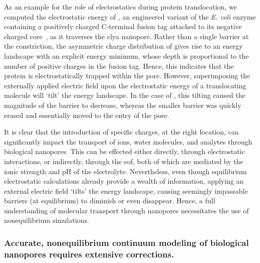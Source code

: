 As an example for the role of electrostatics during protein translocation, we computed the electrostatic
energy of \DHFRt{}, an engineered variant of the \textit{E. coli}  enzyme containing a
positively charged C-terminal fusion tag attached to its negative charged core~\cite{Soskine-Biesemans-2015},
as it traverses the \gls{clya} nanopore. Rather than a single barrier at the constriction, the asymmetric
charge distribution of \DHFRt{} gives rise to an energy landscape with an explicit energy minimum, whose depth
is proportional to the number of positive charges in the fusion tag. Hence, this indicates that the protein is
electrostatically trapped within the pore. However, superimposing the externally applied electric field upon
the electrostatic energy of a translocating molecule will `tilt' the energy landscape. In the case of
\DHFRt{}, this tilting caused the magnitude of the \transi{} barrier to decrease, whereas the smaller \cisi{}
barrier was quickly erased and essentially moved to the \cisi{} entry of the pore.

It is clear that the introduction of specific charges, at the right location, can significantly impact the
transport of ions, water molecules, and analytes through biological nanopores. This can be effected either
directly, through electrostatic interactions, or indirectly, through the \gls{eof}, both of which are mediated
by the ionic strength and pH of the electrolyte. Nevertheless, even though equilibrium electrostatic
calculations already provide a wealth of information, applying an external electric field `tilts' the energy
landscape, causing seemingly impassable barriers (at equilibrium) to diminish or even disappear. Hence, a full
understanding of molecular transport through nanopores necessitates the use of nonequilibrium simulations.


\subsubsection{Accurate, nonequilibrium continuum modeling of biological nanopores requires extensive corrections.}
%

